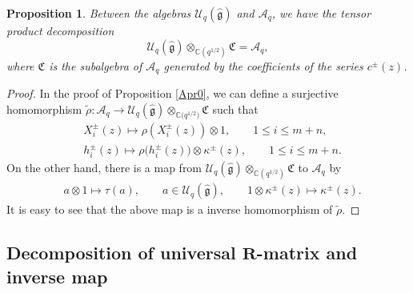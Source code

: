\documentclass[10pt,a4paper]{amsart}
\numberwithin{equation}{section}
\newtheorem{Proposition}[Theorem]{Proposition}
 { \theoremstyle{definition}
\newtheorem{Definition}[Theorem]{Definition}
\newtheorem{Note}[Theorem]{Note}
\newtheorem{Example}[Theorem]{Example}
\newtheorem{Remark}[Theorem]{Remark} }
\begin{document}
\begin{Proposition}\label{Apr1}Between the algebras $\mathcal{U}_q(\mathfrak{\hat{g}})$ and $\mathcal{A}_q$, we have the tensor product decomposition
\[%
 \mathcal{U}_q(\mathfrak{\hat{g}})\otimes_{\mathbb{C}(q^{1/2})}\mathfrak{C}=\mathcal{A}_q,
\]
where $\mathfrak{C}$ is the subalgebra of $\mathcal{A}_q$ generated by the coefficients of the series $c^{\pm}(z)$.
\end{Proposition}

\begin{proof}In the proof of Proposition \ref{Apr0}, we can define a surjective homomorphism $\tilde{\rho}\colon\mathcal{A}_q\rightarrow \mathcal{U}_q(\mathfrak{\hat{g}})\otimes_{\mathbb{C}\bigl(q^{1/2}\bigr)}\mathfrak{C}$ such that
\begin{align*}
 & X_i^{\pm}(z)\mapsto \rho(X_i^{\pm}(z))\otimes1,\qquad 1\leq i\leq m+n,\\
 &h_i^{\pm}(z)\mapsto \rho\bigl(h_i^{\pm}(z)\bigr)\otimes\kappa^{\pm}(z),\qquad 1\leq i\leq m+n.
\end{align*}
On the other hand, there is a map from $\mathcal{U}_q(\mathfrak{\hat{g}})\otimes_{\mathbb{C}(q^{1/2})}\mathfrak{C}$ to
$\mathcal{A}_q$ by
\begin{align*}
 & a\otimes1\mapsto\tau(a),\qquad a\in \mathcal{U}_q(\mathfrak{\hat{g}}),\qquad 1\otimes\kappa^{\pm}(z)\mapsto\kappa^{\pm}(z).
\end{align*}
It is easy to see that the above map is a inverse homomorphism of $\tilde{\rho}$.
\end{proof}


\subsection[Decomposition of universal R-matrix and inverse map]{Decomposition of universal $\boldsymbol{R}$-matrix and inverse map}
\end{document}
